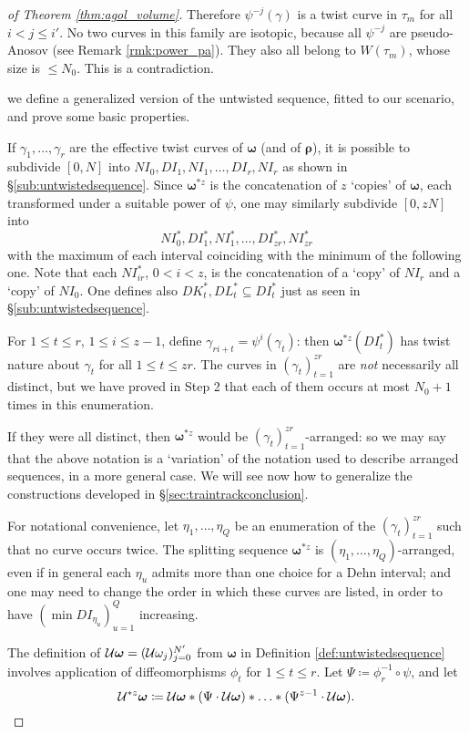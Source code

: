 \begin{proof}[of Theorem \ref{thm:agol_volume}]
Therefore $\psi^{-j}(\gamma)$ is a twist curve in $\tau_m$ for all $i<j\leq i'$. No two curves in this family are isotopic, because all $\psi^{-j}$ are pseudo-Anosov (see Remark \ref{rmk:power_pa}). They also all belong to $W(\tau_m)$, whose size is $\leq N_0$. This is a contradiction.

 we define a generalized version of the untwisted sequence, fitted to our scenario, and prove some basic properties.

If $\gamma_1,\ldots,\gamma_r$ are the effective twist curves of $\bm\omega$ (and of $\bm\rho$), it is possible to subdivide $[0,N]$ into $NI_0,DI_1,NI_1,\ldots, DI_r, NI_r$ as shown in \S \ref{sub:untwistedsequence}. Since $\bm\omega^{*z}$ is the concatenation of $z$ `copies' of $\bm\omega$, each transformed under a suitable power of $\psi$, one may similarly subdivide $[0,zN]$ into
$$NI^*_0,DI^*_1,NI^*_1,\ldots, DI^*_{zr}, NI^*_{zr}$$
with the maximum of each interval coinciding with the minimum of the following one. Note that each $NI^*_{ir}$, $0< i < z$, is the concatenation of a `copy' of $NI_r$ and a `copy' of $NI_0$. One defines also $DK^*_t, DL^*_t\subseteq DI^*_t$ just as seen in \S \ref{sub:untwistedsequence}.

For $1\leq t \leq r$, $1\leq i \leq z-1$, define $\gamma_{ri+t}=\psi^i(\gamma_t)$: then $\bm\omega^{*z}(DI^*_t)$ has twist nature about $\gamma_t$ for all $1\leq t\leq zr$. The curves in $(\gamma_t)_{t=1}^{zr}$ are \emph{not} necessarily all distinct, but we have proved in Step 2 that each of them occurs at most $N_0+1$ times in this enumeration.

If they were all distinct, then $\bm\omega^{*z}$ would be $(\gamma_t)_{t=1}^{zr}$-arranged: so we may say that the above notation is a `variation' of the notation used to describe arranged sequences, in a more general case. We will see now how to generalize the constructions developed in \S \ref{sec:traintrackconclusion}.

For notational convenience, let $\eta_1,\ldots, \eta_Q$ be an enumeration of the $(\gamma_t)_{t=1}^{zr}$ such that no curve occurs twice. The splitting sequence $\bm\omega^{*z}$ is $(\eta_1,\ldots, \eta_Q)$-arranged, even if in general each $\eta_u$ admits more than one choice for a Dehn interval; and one may need to change the order in which these curves are listed, in order to have $\left(\min DI_{\eta_u}\right)_{u=1}^Q$ increasing.

The definition of ${\mathcal U}\bm\omega=({\mathcal U}\omega_j)_{j=0}^{N'}$ from $\bm\omega$ in Definition \ref{def:untwistedsequence} involves application of diffeomorphisms $\phi_t$ for $1 \leq t \leq r$. Let $\Psi\coloneqq \phi_r^{-1}\circ \psi$, and let
$$
{\mathcal U}^{*z}\bm\omega\coloneqq {\mathcal U}\bm\omega*(\Psi\cdot {\mathcal U}\bm\omega)*\ldots*(\Psi^{z-1}\cdot {\mathcal U}\bm\omega).
$$


\end{proof}
